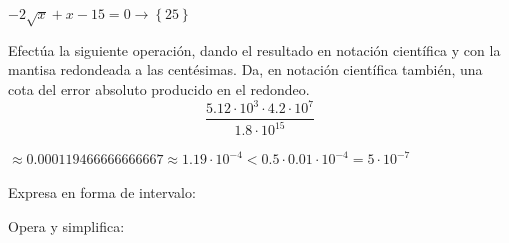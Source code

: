 \documentclass[addpoints,spanish, 12pt,a4paper]{exam}
\begin{document}
\begin{questions}
\begin{solution}
 	$- 2 \sqrt{x} + x - 15 = 0\to \left\{25\right\}$ 
\end{solution}

\question[2] Efectúa la siguiente operación, dando el resultado en notación científica y con la mantisa redondeada a las centésimas. Da, en notación científica también, una cota del error absoluto producido en el redondeo.
$$\frac{5.12\cdot {10}^3 \cdot 4.2\cdot {10}^7}{1.8 \cdot {10}^{15}}$$
\addpoints %


\begin{solution}
 	$\approx 0.000119466666666667 \approx 1.19\cdot {10}^{-4} < 0.5 \cdot 0.01 \cdot {10}^{-4} = 5\cdot {10}^{-7}$ 
 
\end{solution}

\question Expresa en forma de intervalo:

\begin{parts}
\part[1] $\left| {x - 4} \right|< 5$ 
\begin{solution}
$\left(-1, 9\right)$ 
\end{solution}
\part[1] $\left| {x +3 } \right|\geqslant 2$
\begin{solution}
$\left(-\infty, -5\right] \cup \left[.1, \infty\right) $
\end{solution}
\end{parts}

\addpoints


\question Opera y simplifica:

\end{questions}
\end{document}
